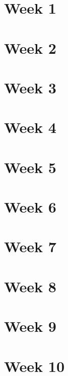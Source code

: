 \documentclass[letterpaper,12pt]{article}
\begin{document}
\renewcommand{\week}{Week 1}
\section*{\week}

\clearpage

\renewcommand{\week}{Week 2}
\section*{\week}

\clearpage

\renewcommand{\week}{Week 3}
\section*{\week}

\clearpage

\renewcommand{\week}{Week 4}
\section*{\week}

\clearpage

\renewcommand{\week}{Week 5}
\section*{\week}

\clearpage

\renewcommand{\week}{Week 6}
\section*{\week}

\clearpage

\renewcommand{\week}{Week 7}
\section*{\week}

\clearpage

\renewcommand{\week}{Week 8}
\section*{\week}

\clearpage

\renewcommand{\week}{Week 9}
\section*{\week}

\clearpage

\renewcommand{\week}{Week 10}
\section*{\week}

\clearpage
\end{document}
